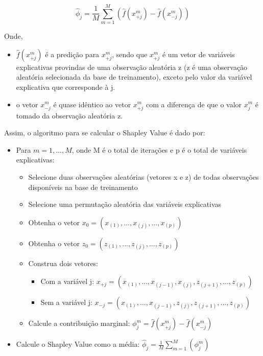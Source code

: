 \begin{equation}
\hat{\phi}_j = \frac{1}{M} \sum^{M}_{m=1}(\hat{f}(x^m_{+j}) - \hat{f}(x^m_{-j}))
\end{equation}

Onde,

\begin{itemize}
	\item $ \hat{f}(x^m_{+j}) $ é a predição para $ x^m_{+j} $, sendo que $ x^m_{+j} $ é um vetor de variáveis explicativas provindas de uma observação aleatória z (z é uma observação aleatória selecionada da base de treinamento), exceto pelo valor da variável explicativa que corresponde à j.
	\item o vetor $ x^m_{-j} $ é quase idêntico ao vetor $ x^m_{+j} $ com a diferença de que o valor $ x^m_j $ é tomado da observação aleatória z.
\end{itemize}

Assim, o algoritmo para se calcular o Shapley Value é dado por:

\begin{itemize}
	\item Para $ m=1,...,M $, onde M é o total de iterações e p é o total de variáveis explicativas:
	\begin{itemize}
		\item Selecione duas observações aleatórias (vetores x e z) de todas observações disponíveis na base de treinamento
		\item Selecione uma permutação aleatória das variáveis explicativas
		\item Obtenha o vetor $ x_0 = (x_{(1)},...,x_{(j)},...,x_{(p)}) $
		\item Obtenha o vetor $ z_0 = (z_{(1)},...,z_{(j)},...,z_{(p)}) $
		\item Construa dois vetores:
		\begin{itemize}
			\item Com a variável j: $ x_{+j} = (x_{(1)},...,x_{(j-1)},x_{(j)},z_{(j+1)},...,z_{(p)}) $
			\item Sem a variável j: $ x_{-j} = (x_{(1)},...,x_{(j-1)},z_{(j)},z_{(j+1)},...,z_{(p)}) $
		\end{itemize}
		\item Calcule a contribuição marginal: $ \phi_j^m = \hat{f}(x^m_{+j}) - \hat{f}(x^m_{-j}) $
	\end{itemize}
	\item Calcule o Shapley Value como a média: $ \hat{\phi}_j = \frac{1}{M} \sum^{M}_{m=1}(\phi_j^m) $
\end{itemize}

